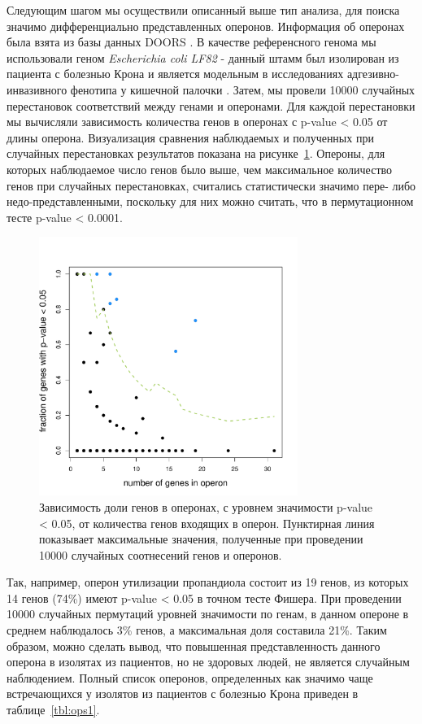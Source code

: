 Следующим шагом мы осуществили описанный выше тип анализа, для поиска значимо дифференциально представленных оперонов. Информация об оперонах была взята из базы данных DOORS \cite{mao2014door}. В качестве референсного генома мы использовали геном \textit{Escherichia coli LF82} - данный штамм был изолирован из пациента с болезнью Крона и является модельным в исследованиях адгезивно-инвазивного фенотипа у кишечной палочки \cite{miquel2010complete}. Затем, мы провели 10000 случайных перестановок соответствий между генами и оперонами. Для каждой перестановки мы вычисляли зависимость количества генов в оперонах с p-value < 0.05 от длины оперона. Визуализация сравнения наблюдаемых и полученных при случайных перестановках результатов показана на рисунке~\ref{img:operons_shuffle}. Опероны, для которых наблюдаемое число генов было выше, чем максимальное количество генов при случайных перестановках, считались статистически значимо пере- либо недо-представленными, поскольку для них можно считать, что в пермутационном тесте p-value < 0.0001. 

\begin{figure}[!ht] 
  \center
    \includegraphics [width=0.75\textwidth] {Dissertation/images/operons/statsignificant_operons.pdf}
    \caption{Зависимость доли генов в оперонах, с уровнем значимости p-value < 0.05, от количества генов входящих в оперон. Пунктирная линия показывает максимальные значения, полученные при проведении 10000 случайных соотнесений генов и оперонов.}
    \label{img:operons_shuffle}
\end{figure}

Так, например, оперон утилизации пропандиола состоит из 19 генов, из которых 14 генов (74\%) имеют p-value < 0.05 в точном тесте Фишера. При проведении 10000 случайных пермутаций уровней значимости по генам, в данном опероне в среднем наблюдалось 3\% генов, а максимальная доля составила 21\%. Таким образом, можно сделать вывод, что повышенная представленность данного оперона в изолятах из пациентов, но не здоровых людей, не является случайным наблюдением. Полный список оперонов, определенных как значимо чаще встречающихся у изолятов из пациентов с болезнью Крона приведен в таблице~\ref{tbl:ops1}. 

